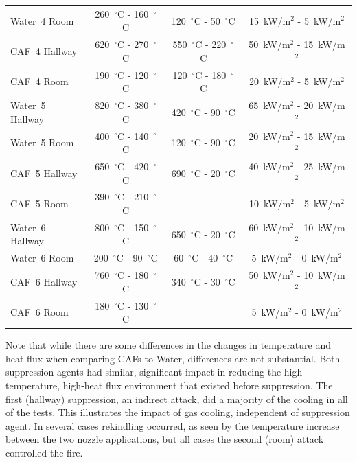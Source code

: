 \documentclass[12pt,oneside]{book}
\begin{document}
\begin{table}[!ht]
\begin{tabular}{lccc}
Water~4 Room     & 260~$^{\circ}$C - 160~$^{\circ}$C   & 120~$^{\circ}$C - 50~$^{\circ}$C    & 15~kW/m$^2$ - 5~kW/m$^2$  \\ [.25cm]
CAF~4 Hallway    & 620~$^{\circ}$C - 270~$^{\circ}$C   & 550~$^{\circ}$C - 220~$^{\circ}$C   & 50~kW/m$^2$ - 15~kW/m$^2$  \\
CAF~4 Room       & 190~$^{\circ}$C - 120~$^{\circ}$C   & 120~$^{\circ}$C - 180~$^{\circ}$C   & 20~kW/m$^2$ - 5~kW/m$^2$  \\ [.25cm]
Water~5 Hallway  & 820~$^{\circ}$C - 380~$^{\circ}$C   & 420~$^{\circ}$C - 90~$^{\circ}$C    & 65~kW/m$^2$ - 20~kW/m$^2$  \\
Water~5 Room     & 400~$^{\circ}$C - 140~$^{\circ}$C   & 120~$^{\circ}$C - 90~$^{\circ}$C    & 20~kW/m$^2$ - 15~kW/m$^2$  \\ [.25cm]
CAF~5 Hallway    & 650~$^{\circ}$C - 420~$^{\circ}$C   & 690~$^{\circ}$C - 20~$^{\circ}$C    & 40~kW/m$^2$ - 25~kW/m$^2$  \\
CAF~5 Room       & 390~$^{\circ}$C - 210~$^{\circ}$C   &                                     & 10~kW/m$^2$ - 5~kW/m$^2$  \\ [.25cm]
Water~6 Hallway  & 800~$^{\circ}$C - 150~$^{\circ}$C   & 650~$^{\circ}$C - 20~$^{\circ}$C    & 60~kW/m$^2$ - 10~kW/m$^2$  \\
Water~6 Room     & 200~$^{\circ}$C - 90~$^{\circ}$C    & 60~$^{\circ}$C - 40~$^{\circ}$C     & 5~kW/m$^2$ - 0~kW/m$^2$  \\ [.25cm]
CAF~6 Hallway    & 760~$^{\circ}$C - 180~$^{\circ}$C   & 340~$^{\circ}$C - 30~$^{\circ}$C    & 50~kW/m$^2$ - 10~kW/m$^2$  \\
CAF~6 Room       & 180~$^{\circ}$C - 130~$^{\circ}$C   &                                     & 5~kW/m$^2$ - 0~kW/m$^2$  \\ [.25cm]
\bottomrule[1.25pt]
\end{tabular}\par
\end{table}

Note that while there are some differences in the changes in temperature and heat flux when comparing CAFs to Water, differences are not substantial. Both suppression agents had similar, significant impact in reducing the high-temperature, high-heat flux environment that existed before suppression. The first (hallway) suppression, an indirect attack, did a majority of the cooling in all of the tests. This illustrates the impact of gas cooling, independent of suppression agent. In several cases rekindling occurred, as seen by the temperature increase between the two nozzle applications, but all cases the second (room) attack controlled the fire.
\end{document}
